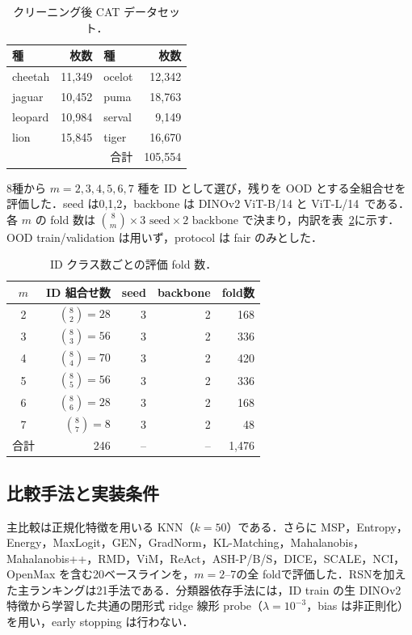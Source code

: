 \documentclass[uplatex,dvipdfmx,a4paper,10pt,twocolumn]{bxjsarticle}
\newcommand{\RSN}{RSN}
\newcommand{\knn}{KNN}
\begin{document}
\begin{table}[t]
\centering
\caption{クリーニング後 CAT データセット．}
\label{tab:counts}
\begin{tabular}{lr@{\hspace{7mm}}lr}
\toprule
種 & 枚数 & 種 & 枚数\\
\midrule
cheetah & 11,349 & ocelot & 12,342\\
jaguar  & 10,452 & puma   & 18,763\\
leopard & 10,984 & serval &  9,149\\
lion    & 15,845 & tiger  & 16,670\\
\midrule
\multicolumn{3}{r}{合計} & 105,554\\
\bottomrule
\end{tabular}
\end{table}

8種から $m=2,3,4,5,6,7$ 種を ID として選び，残りを OOD とする全組合せを評価した．seed は0,1,2，backbone は DINOv2 ViT-B/14 と ViT-L/14~\cite{oquab2024dinov2}である．各 $m$ の fold 数は $\binom{8}{m}\times3\text{ seed}\times2\text{ backbone}$ で決まり，内訳を表~\ref{tab:folds}に示す．OOD train/validation は用いず，protocol は fair のみとした．

\begin{table}[t]
\centering
\small
\caption{ID クラス数ごとの評価 fold 数．}
\label{tab:folds}
\begin{tabular}{crrrr}
\toprule
$m$ & ID 組合せ数 & seed & backbone & fold数\\
\midrule
2 & $\binom{8}{2}=28$ & 3 & 2 & 168\\
3 & $\binom{8}{3}=56$ & 3 & 2 & 336\\
4 & $\binom{8}{4}=70$ & 3 & 2 & 420\\
5 & $\binom{8}{5}=56$ & 3 & 2 & 336\\
6 & $\binom{8}{6}=28$ & 3 & 2 & 168\\
7 & $\binom{8}{7}=8$  & 3 & 2 & 48\\
\midrule
合計 & 246 & -- & -- & 1,476\\
\bottomrule
\end{tabular}
\end{table}

\subsection{比較手法と実装条件}

主比較は正規化特徴を用いる \knn（$k=50$）である．さらに MSP，Entropy，Energy，MaxLogit，GEN，GradNorm，KL-Matching，Mahalanobis，Mahalanobis++，RMD，ViM，ReAct，ASH-P/B/S，DICE，SCALE，NCI，OpenMax を含む20ベースラインを，$m=2$--7の全 foldで評価した．\RSN を加えた主ランキングは21手法である．分類器依存手法には，ID train の生 DINOv2 特徴から学習した共通の閉形式 ridge 線形 probe（$\lambda=10^{-3}$，bias は非正則化）を用い，early stopping は行わない．
\end{document}
